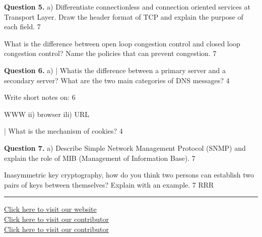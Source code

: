 \documentclass[11pt,a4paper]{article}
\begin{document}
\medskip\noindent\textbf{Question 5.} a) Differentiate connectionless and connection oriented services at Transport Layer. Draw the
header format of TCP and explain the purpose of each field. 7
\begin{parts}
  \item What is the difference between open loop congestion control and closed loop congestion
  control? Name the policies that can prevent congestion. 7
\end{parts}

\medskip\noindent\textbf{Question 6.} a) | Whatis the difference between a primary server and a secondary server? What are the two
main categories of DNS messages? 4
\begin{parts}
  \item Write short notes on: 6
  \item WWW ii) browser ili) URL
  \item | What is the mechanism of cookies? 4
\end{parts}

\medskip\noindent\textbf{Question 7.} a) Describe Simple Network Management Protocol (SNMP) and explain the role of MIB
(Management of Information Base). 7
\begin{parts}
  \item Inasymmetric key cryptography, how do you think two persons can establish two pairs of
  keys between themselves? Explain with an example. 7
  RRR
\end{parts}

\vfill
\rule{\linewidth}{0.4pt}
\begin{center}\small
\href{https://bhu-exam.vercel.app/}{Click here to visit our website}\\[4pt]\href{https://me-aryan.vercel.app/}{Click here to visit our contributor}\\[4pt]\href{https://quashan-me.vercel.app/}{Click here to visit our contributor}
\end{center}
\end{document}
